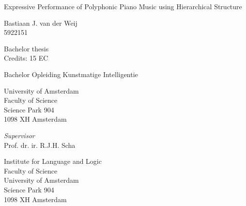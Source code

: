 \documentclass[a4paper,10pt]{article}
\begin{document}

\begin{titlepage}
\begin{center}

\vspace{2.5cm}

\begin{Huge}
Expressive Performance of Polyphonic Piano Music using Hierarchical Structure
\end{Huge}

\vspace{1.5cm}

Bastiaan J. van der Weij\\
5922151

\vspace{1.5cm}

Bachelor thesis\\
Credits: 15 EC

\vspace{0.5cm}

Bachelor Opleiding Kunstmatige Intelligentie

\vspace{0.25cm}

University of Amsterdam\\
Faculty of Science\\
Science Park 904\\
1098 XH Amsterdam

\vspace{4cm}

\emph{Supervisor}\\
Prof. dr. ir. R.J.H. Scha

\vspace{0.25cm}

Institute for Language and Logic\\
Faculty of Science\\
University of Amsterdam\\
Science Park 904\\
1098 XH  Amsterdam


\end{center}
\end{titlepage}
\end{document}

